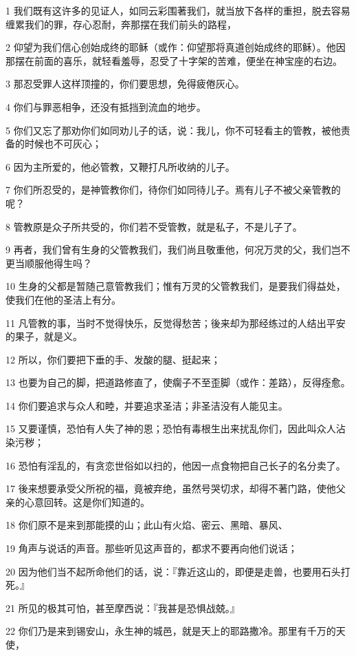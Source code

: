 \par 1 我们既有这许多的见证人，如同云彩围著我们，就当放下各样的重担，脱去容易缠累我们的罪，存心忍耐，奔那摆在我们前头的路程，
\par 2 仰望为我们信心创始成终的耶稣（或作：仰望那将真道创始成终的耶稣）。他因那摆在前面的喜乐，就轻看羞辱，忍受了十字架的苦难，便坐在神宝座的右边。
\par 3 那忍受罪人这样顶撞的，你们要思想，免得疲倦灰心。
\par 4 你们与罪恶相争，还没有抵挡到流血的地步。
\par 5 你们又忘了那劝你们如同劝儿子的话，说：我儿，你不可轻看主的管教，被他责备的时候也不可灰心；
\par 6 因为主所爱的，他必管教，又鞭打凡所收纳的儿子。
\par 7 你们所忍受的，是神管教你们，待你们如同待儿子。焉有儿子不被父亲管教的呢？
\par 8 管教原是众子所共受的，你们若不受管教，就是私子，不是儿子了。
\par 9 再者，我们曾有生身的父管教我们，我们尚且敬重他，何况万灵的父，我们岂不更当顺服他得生吗？
\par 10 生身的父都是暂随己意管教我们；惟有万灵的父管教我们，是要我们得益处，使我们在他的圣洁上有分。
\par 11 凡管教的事，当时不觉得快乐，反觉得愁苦；後来却为那经练过的人结出平安的果子，就是义。
\par 12 所以，你们要把下垂的手、发酸的腿、挺起来；
\par 13 也要为自己的脚，把道路修直了，使瘸子不至歪脚（或作：差路），反得痊愈。
\par 14 你们要追求与众人和睦，并要追求圣洁；非圣洁没有人能见主。
\par 15 又要谨慎，恐怕有人失了神的恩；恐怕有毒根生出来扰乱你们，因此叫众人沾染污秽；
\par 16 恐怕有淫乱的，有贪恋世俗如以扫的，他因一点食物把自己长子的名分卖了。
\par 17 後来想要承受父所祝的福，竟被弃绝，虽然号哭切求，却得不著门路，使他父亲的心意回转。这是你们知道的。
\par 18 你们原不是来到那能摸的山；此山有火焰、密云、黑暗、暴风、
\par 19 角声与说话的声音。那些听见这声音的，都求不要再向他们说话；
\par 20 因为他们当不起所命他们的话，说：『靠近这山的，即便是走兽，也要用石头打死。』
\par 21 所见的极其可怕，甚至摩西说：『我甚是恐惧战兢。』
\par 22 你们乃是来到锡安山，永生神的城邑，就是天上的耶路撒冷。那里有千万的天使，
